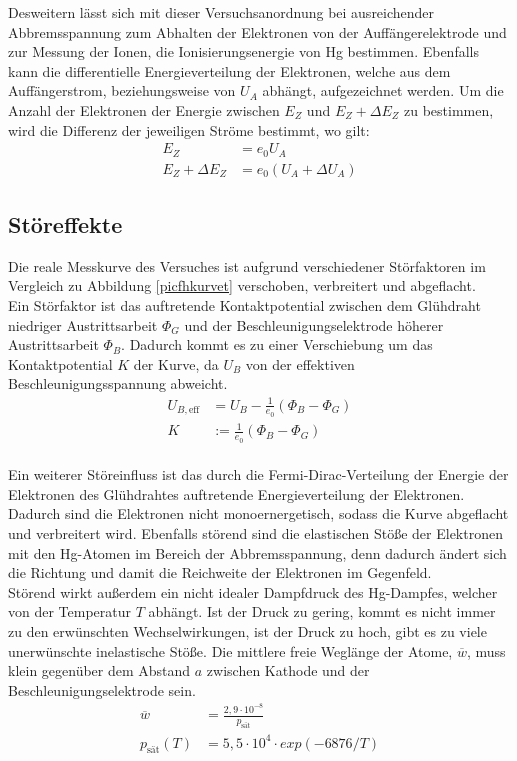 Desweitern lässt sich mit dieser Versuchsanordnung bei ausreichender Abbremsspannung zum Abhalten
der Elektronen von der Auffängerelektrode und zur Messung der Ionen, die 
Ionisierungsenergie von Hg bestimmen. Ebenfalls kann die differentielle Energieverteilung der Elektronen,
welche aus dem Auffängerstrom, beziehungsweise von $U_A$ abhängt, aufgezeichnet werden.
Um die Anzahl der Elektronen der Energie zwischen $E_Z$ und $E_Z + \Delta E_Z$ zu bestimmen, wird
die Differenz der jeweiligen Ströme bestimmt, wo gilt:
\begin{align}
E_Z&=e_0 U_A \\
E_Z + \Delta E_Z &= e_0 (U_A + \Delta U_A) \label{eqbla}
\end{align}
\subsection{Störeffekte}
 Die reale Messkurve des Versuches ist aufgrund verschiedener Störfaktoren im Vergleich zu Abbildung
 \ref{picfhkurvet} verschoben, verbreitert und abgeflacht. \\
 
 Ein Störfaktor ist das auftretende Kontaktpotential zwischen dem Glühdraht niedriger Austrittsarbeit
$\Phi_G$ 
 und der Beschleunigungselektrode höherer Austrittsarbeit $\Phi_B$. 
 Dadurch kommt es zu einer Verschiebung um das Kontaktpotential $K$
 der Kurve, da $U_B$ von der effektiven Beschleunigungsspannung abweicht.
 \begin{align}
 U_{B, \text{eff}}&=U_B - \frac{1}{e_0} (\Phi_B - \Phi_G) \\
 K&:=\frac{1}{e_0}(\Phi_B - \Phi_G)
 \end{align}
\\
Ein weiterer Störeinfluss ist das durch die Fermi-Dirac-Verteilung der Energie der Elektronen des 
Glühdrahtes auftretende Energieverteilung der Elektronen. Dadurch sind die Elektronen nicht 
monoernergetisch, sodass die Kurve abgeflacht und verbreitert wird. Ebenfalls störend sind die 
elastischen Stöße der Elektronen mit den Hg-Atomen im Bereich der Abbremsspannung, denn dadurch ändert 
sich die Richtung und damit die Reichweite der Elektronen im Gegenfeld.\\
Störend wirkt außerdem ein nicht idealer Dampfdruck des Hg-Dampfes, welcher von der Temperatur $T$ abhängt.
Ist der Druck zu gering, kommt es
nicht immer zu den erwünschten Wechselwirkungen, ist der Druck zu hoch, gibt es zu viele unerwünschte 
inelastische Stöße. Die mittlere freie Weglänge der Atome, $\overline w$, muss klein gegenüber dem
Abstand $a$ zwischen Kathode und der Beschleunigungselektrode sein.
\begin{align}
\overline w &=\frac{2,9\cdot 10^{-8}}{p_{\text{sät}}} \label{eqwstrich}\\
p_{\text{sät}}(T)&=5,5 \cdot 10^{4} \cdot exp(-6876/T) \label{eqdruck}
\end{align} 
